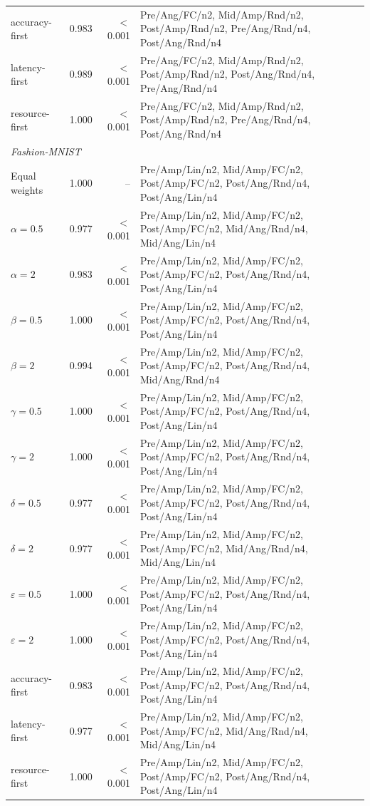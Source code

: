\begin{table}[!t]
\begin{tabular}{lrrl}
accuracy-first & 0.983 & $<$0.001 & Pre/Ang/FC/n2, Mid/Amp/Rnd/n2, Post/Amp/Rnd/n2, Pre/Ang/Rnd/n4, Post/Ang/Rnd/n4 \\
latency-first & 0.989 & $<$0.001 & Pre/Ang/FC/n2, Mid/Amp/Rnd/n2, Post/Amp/Rnd/n2, Post/Ang/Rnd/n4, Pre/Ang/Rnd/n4 \\
resource-first & 1.000 & $<$0.001 & Pre/Ang/FC/n2, Mid/Amp/Rnd/n2, Post/Amp/Rnd/n2, Pre/Ang/Rnd/n4, Post/Ang/Rnd/n4 \\
\midrule
\multicolumn{4}{l}{\textit{Fashion-MNIST}} \\
Equal weights & 1.000 & -- & Pre/Amp/Lin/n2, Mid/Amp/FC/n2, Post/Amp/FC/n2, Post/Ang/Rnd/n4, Post/Ang/Lin/n4 \\
$\alpha = 0.5$ & 0.977 & $<$0.001 & Pre/Amp/Lin/n2, Mid/Amp/FC/n2, Post/Amp/FC/n2, Mid/Ang/Rnd/n4, Mid/Ang/Lin/n4 \\
$\alpha = 2$ & 0.983 & $<$0.001 & Pre/Amp/Lin/n2, Mid/Amp/FC/n2, Post/Amp/FC/n2, Post/Ang/Rnd/n4, Post/Ang/Lin/n4 \\
$\beta = 0.5$ & 1.000 & $<$0.001 & Pre/Amp/Lin/n2, Mid/Amp/FC/n2, Post/Amp/FC/n2, Post/Ang/Rnd/n4, Post/Ang/Lin/n4 \\
$\beta = 2$ & 0.994 & $<$0.001 & Pre/Amp/Lin/n2, Mid/Amp/FC/n2, Post/Amp/FC/n2, Post/Ang/Rnd/n4, Mid/Ang/Rnd/n4 \\
$\gamma = 0.5$ & 1.000 & $<$0.001 & Pre/Amp/Lin/n2, Mid/Amp/FC/n2, Post/Amp/FC/n2, Post/Ang/Rnd/n4, Post/Ang/Lin/n4 \\
$\gamma = 2$ & 1.000 & $<$0.001 & Pre/Amp/Lin/n2, Mid/Amp/FC/n2, Post/Amp/FC/n2, Post/Ang/Rnd/n4, Post/Ang/Lin/n4 \\
$\delta = 0.5$ & 0.977 & $<$0.001 & Pre/Amp/Lin/n2, Mid/Amp/FC/n2, Post/Amp/FC/n2, Post/Ang/Rnd/n4, Post/Ang/Lin/n4 \\
$\delta = 2$ & 0.977 & $<$0.001 & Pre/Amp/Lin/n2, Mid/Amp/FC/n2, Post/Amp/FC/n2, Mid/Ang/Rnd/n4, Mid/Ang/Lin/n4 \\
$\varepsilon = 0.5$ & 1.000 & $<$0.001 & Pre/Amp/Lin/n2, Mid/Amp/FC/n2, Post/Amp/FC/n2, Post/Ang/Rnd/n4, Post/Ang/Lin/n4 \\
$\varepsilon = 2$ & 1.000 & $<$0.001 & Pre/Amp/Lin/n2, Mid/Amp/FC/n2, Post/Amp/FC/n2, Post/Ang/Rnd/n4, Post/Ang/Lin/n4 \\
accuracy-first & 0.983 & $<$0.001 & Pre/Amp/Lin/n2, Mid/Amp/FC/n2, Post/Amp/FC/n2, Post/Ang/Rnd/n4, Post/Ang/Lin/n4 \\
latency-first & 0.977 & $<$0.001 & Pre/Amp/Lin/n2, Mid/Amp/FC/n2, Post/Amp/FC/n2, Mid/Ang/Rnd/n4, Mid/Ang/Lin/n4 \\
resource-first & 1.000 & $<$0.001 & Pre/Amp/Lin/n2, Mid/Amp/FC/n2, Post/Amp/FC/n2, Post/Ang/Rnd/n4, Post/Ang/Lin/n4 \\
\bottomrule
\end{tabular}
\end{table}
